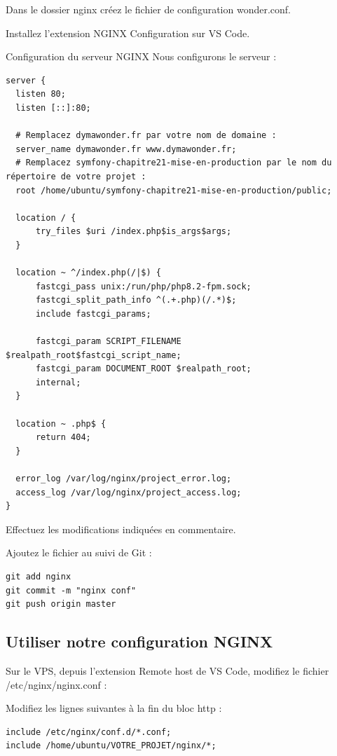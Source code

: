 \documentclass{article}
\begin{document}
Dans le dossier nginx créez le fichier de configuration wonder.conf.

Installez l'extension NGINX Configuration sur VS Code.

Configuration du serveur NGINX
Nous configurons le serveur :
\begin{verbatim}
server {
  listen 80;
  listen [::]:80;

  # Remplacez dymawonder.fr par votre nom de domaine :
  server_name dymawonder.fr www.dymawonder.fr;
  # Remplacez symfony-chapitre21-mise-en-production par le nom du répertoire de votre projet :
  root /home/ubuntu/symfony-chapitre21-mise-en-production/public;

  location / {
      try_files $uri /index.php$is_args$args;
  }

  location ~ ^/index.php(/|$) {
      fastcgi_pass unix:/run/php/php8.2-fpm.sock;
      fastcgi_split_path_info ^(.+.php)(/.*)$;
      include fastcgi_params;

      fastcgi_param SCRIPT_FILENAME $realpath_root$fastcgi_script_name;
      fastcgi_param DOCUMENT_ROOT $realpath_root;
      internal;
  }

  location ~ .php$ {
      return 404;
  }

  error_log /var/log/nginx/project_error.log;
  access_log /var/log/nginx/project_access.log;
}
\end{verbatim}

Effectuez les modifications indiquées en commentaire.

Ajoutez le fichier au suivi de Git :
\begin{verbatim}
git add nginx
git commit -m "nginx conf"
git push origin master
\end{verbatim}

\subsection{Utiliser notre configuration NGINX}
Sur le VPS, depuis l'extension Remote host de VS Code, modifiez le fichier /etc/nginx/nginx.conf :

Modifiez les lignes suivantes à la fin du bloc http :
\begin{verbatim}
include /etc/nginx/conf.d/*.conf;
include /home/ubuntu/VOTRE_PROJET/nginx/*;
\end{verbatim}
\end{document}

